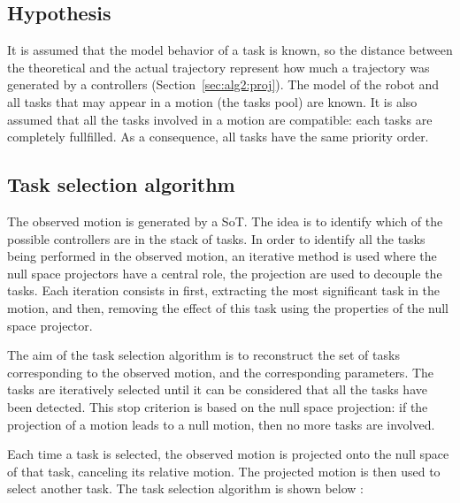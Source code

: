 \documentclass[letterpaper, 10pt, conference]{ieeeconf}      %
\begin{document}
\subsection{Hypothesis}
It is assumed that the model behavior of a task is known, so the distance between
the theoretical and the actual trajectory represent how much a trajectory
was generated by a controllers (Section~\ref{sec:alg2:proj}).
The model of the robot and all tasks that may appear in a motion (the tasks pool) are known.
It is also assumed that all the tasks involved in a motion are compatible:
each tasks are completely fullfilled. As a consequence, all
tasks have the same priority order. 

\subsection{Task selection algorithm} \label{sec:alg1:selec}
The observed motion is generated by a SoT.  The idea is to identify which of the possible controllers are in the stack of tasks. 
In order to identify all the
tasks being performed in the observed motion, an iterative method is used where
the null space projectors have a central role, the projection
are used to decouple the tasks.
Each iteration consists in first, extracting the most significant task in the motion,
and then, removing the effect of this task using the properties of the null space projector.

The aim of the task selection algorithm is to reconstruct the set of tasks corresponding
to the observed motion, and the corresponding parameters.
The tasks are iteratively selected until it can be considered that all the tasks
have been detected.
This stop criterion is based on the
null space projection: if the projection of a motion
leads to a null motion, then no more tasks are involved.

Each time a task is selected, the observed motion is projected
onto the null space of that task, canceling its relative motion. 
The projected motion is then used to select another task.
The task selection algorithm is shown below :

\newcommand{\shOUTPUT}{\textbf{Output: }}
\newcommand{\shINPUT}{\textbf{Input: }}
\end{document}
